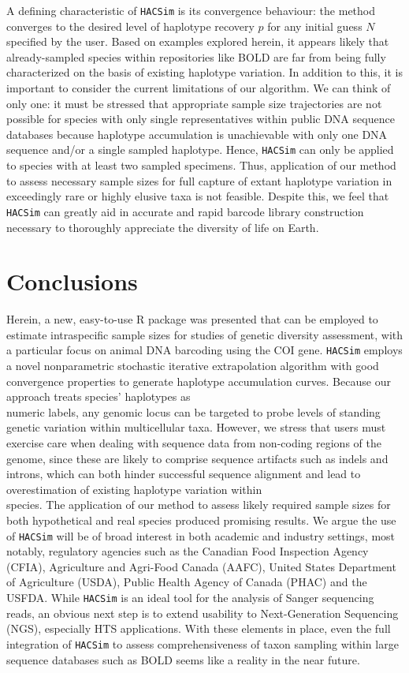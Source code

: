 A defining characteristic of {\tt HACSim} is its convergence behaviour: the method \\ converges to the desired level of haplotype recovery $p$ for any initial guess $N$ specified by the user. Based on examples explored herein, it appears likely that already-sampled species within repositories like BOLD are far from being fully characterized on the basis of existing haplotype variation. In addition to this, it is important to consider the current limitations of our algorithm. We can think of only one: it must be stressed that appropriate sample size trajectories are not possible for species with only single representatives within public DNA sequence databases because haplotype accumulation is unachievable with only one DNA sequence and/or a single sampled haplotype. Hence, {\tt HACSim} can only be applied to species with at least two sampled specimens. Thus, application of our method to assess necessary sample sizes for full capture of extant haplotype variation in exceedingly rare or highly elusive taxa is not feasible. Despite this, we feel that {\tt HACSim} can greatly aid in accurate and rapid barcode library construction necessary to thoroughly appreciate the diversity of life on Earth.

\section{Conclusions}

Herein, a new, easy-to-use R package was presented that can be employed to estimate intraspecific sample sizes for studies of genetic diversity assessment, with a particular focus on animal DNA barcoding using the COI gene. {\tt HACSim} employs a novel nonparametric stochastic iterative extrapolation algorithm with good convergence properties to generate haplotype accumulation curves. Because our approach treats species' haplotypes as \\ numeric labels, any genomic locus can be targeted to probe levels of standing genetic variation within multicellular taxa. However, we stress that users must exercise care when dealing with sequence data from non-coding regions of the genome, since these are likely to comprise sequence artifacts such as indels and introns, which can both hinder successful sequence alignment and lead to overestimation of existing haplotype variation within \\ species. The application of our method to assess likely required sample sizes for both hypothetical and real species produced promising results. We argue the use of {\tt HACSim} will be of broad interest in both academic and industry settings, most notably, regulatory agencies such as the Canadian Food Inspection Agency (CFIA), Agriculture and Agri-Food Canada (AAFC), United States Department of Agriculture (USDA), Public Health Agency of Canada (PHAC) and the USFDA. While {\tt HACSim} is an ideal tool for the analysis of Sanger sequencing reads, an obvious next step is to extend usability to Next-Generation Sequencing (NGS), especially HTS applications. With these elements in place, even the full integration of {\tt HACSim} to assess comprehensiveness of taxon sampling within large sequence databases such as BOLD seems like a reality in the near future.


